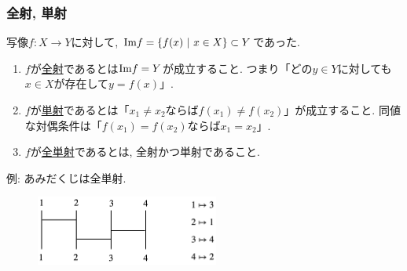 \begin{frame}
\frametitle{全射, 単射}

写像$f:X\rightarrow Y$に対して, 
$\mathrm{Im} f =\{ f(x) \ | \ x \in X\} \subset Y$であった. 
\begin{Def}
\begin{enumerate}
\item $f$が\underline{全射}であるとは$\mathrm{Im} f = Y$が成立すること. 
つまり「どの$y \in Y$に対しても$x \in X$が存在して$y=f(x)$」. 
\item $f$が\underline{単射}であるとは「$x_1\ne x_2$ならば$f(x_1)\ne f(x_2)$」が成立すること. 
同値な対偶条件は「$f(x_1)= f(x_2)$ならば$x_1= x_2$」.  
\item $f$が\underline{全単射}であるとは, 全射かつ単射であること. 
\end{enumerate}
\end{Def}

例: あみだくじは全単射. 

\vspace{-2mm}

 \begin{figure}[htbp]
 \begin{center} 
  \includegraphics[width=60mm]{calculus6/amida.png}
 \end{center}
\end{figure}

\vspace{-2mm}


\end{frame}




